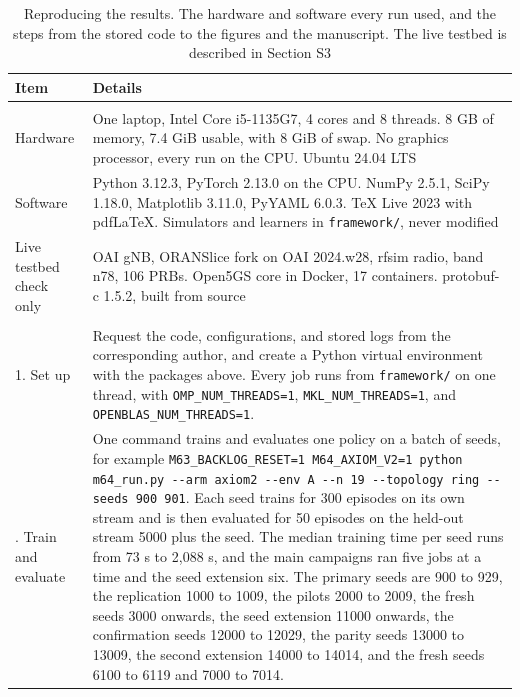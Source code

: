 \documentclass[9pt]{extarticle}
\begin{document}
\begin{table}[!htbp]
\caption{Reproducing the results. The hardware and software every run used, and the steps from the stored code to the figures and the manuscript. The live testbed is described in Section S3}
\label{tab:repro}
\centering
\scriptsize
{\setlength{\tabcolsep}{3pt}
\begin{tabular}{@{}>{\raggedright\arraybackslash}p{2.35cm}>{\raggedright\arraybackslash}p{10.35cm}@{}}
\toprule
Item & Details \\
\midrule
\multicolumn{2}{@{}l}{What is needed} \\
\cmidrule(r){1-2}
Hardware & One laptop, Intel Core i5-1135G7, 4 cores and 8 threads. 8 GB of memory, 7.4 GiB usable, with 8 GiB of swap. No graphics processor, every run on the CPU. Ubuntu 24.04 LTS \\
Software & Python 3.12.3, PyTorch 2.13.0 on the CPU. NumPy 2.5.1, SciPy 1.18.0, Matplotlib 3.11.0, PyYAML 6.0.3. TeX Live 2023 with pdfLaTeX. Simulators and learners in \texttt{framework/}, never modified \\
Live testbed check only & OAI gNB, ORANSlice fork on OAI 2024.w28, rfsim radio, band n78, 106 PRBs. Open5GS core in Docker, 17 containers. protobuf-c 1.5.2, built from source \\
\midrule
\multicolumn{2}{@{}l}{Steps} \\
\cmidrule(r){1-2}
1. Set up & Request the code, configurations, and stored logs from the corresponding author, and create a Python virtual environment with the packages above. Every job runs from \texttt{framework/} on one thread, with \texttt{OMP\_NUM\_THREADS=1}, \texttt{MKL\_NUM\_THREADS=1}, and \texttt{OPENBLAS\_NUM\_THREADS=1}. \\
2. Train and evaluate & One command trains and evaluates one policy on a batch of seeds, for example \texttt{M63\_BACKLOG\_RESET=1 M64\_AXIOM\_V2=1 python m64\_run.py -{}-arm axiom2 -{}-env A -{}-n 19 -{}-topology ring -{}-seeds 900 901}. Each seed trains for 300 episodes on its own stream and is then evaluated for 50 episodes on the held-out stream 5000 plus the seed. The median training time per seed runs from 73 s to 2{,}088 s, and the main campaigns ran five jobs at a time and the seed extension six. The primary seeds are 900 to 929, the replication 1000 to 1009, the pilots 2000 to 2009, the fresh seeds 3000 onwards, the seed extension 11000 onwards, the confirmation seeds 12000 to 12029, the parity seeds 13000 to 13009, the second extension 14000 to 14014, and the fresh seeds 6100 to 6119 and 7000 to 7014. \\

\end{tabular}}
\end{table}
\end{document}
